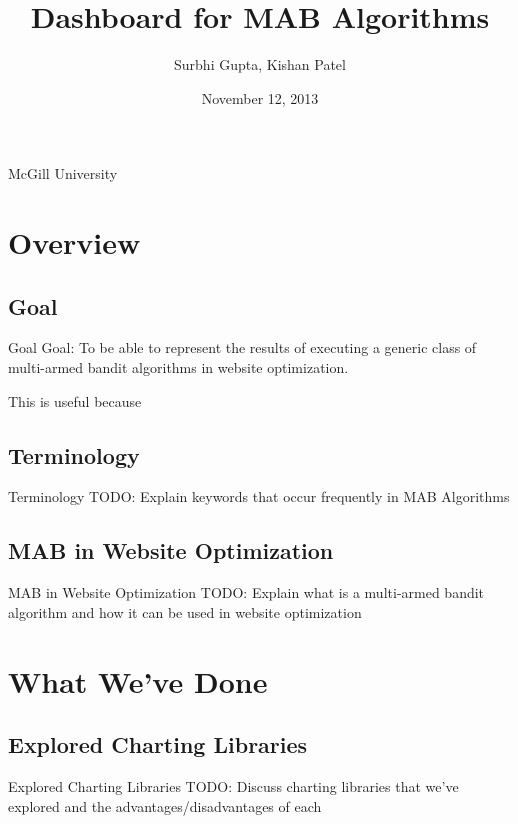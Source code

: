 \documentclass{beamer}
\begin{document}
\title[Dashboard for MAB Algorithms]{Dashboard for MAB Algorithms}
\author[Surbhi Gupta, Kishan Patel]{Surbhi Gupta, Kishan Patel}
\date{November 12, 2013}

\begin{frame}
\titlepage
\begin{center}
McGill University
\end{center}
\end{frame}

\begin{frame}
\tableofcontents
\end{frame}

\section{Overview}

\subsection{Goal}
\begin{frame}{Goal}
Goal: To be able to represent the results of executing a generic class of
multi-armed bandit algorithms in website optimization.

This is useful because
\end{frame}

\subsection{Terminology}
\begin{frame}{Terminology}
TODO: Explain keywords that occur frequently in MAB Algorithms
\end{frame}

\subsection{MAB in Website Optimization}
\begin{frame}{MAB in Website Optimization}
TODO: Explain what is a multi-armed bandit algorithm and how it can be used in website optimization
\end{frame}

\section{What We've Done}

\subsection{Explored Charting Libraries}
\begin{frame}{Explored Charting Libraries}
TODO: Discuss charting libraries that we've explored and the advantages/disadvantages of each
\end{frame}
\end{document}
